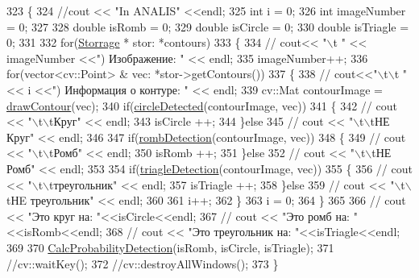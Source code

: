 \begin{DoxyCode}
323 \{
324     \textcolor{comment}{//cout << "In ANALIS" <<endl;}
325     \textcolor{keywordtype}{int} i = 0;
326     \textcolor{keywordtype}{int} imageNumber = 0;
327 
328     \textcolor{keywordtype}{double} isRomb = 0;
329     \textcolor{keywordtype}{double} isCircle = 0;
330     \textcolor{keywordtype}{double} isTriagle = 0;
331 
332     \textcolor{keywordflow}{for}(\hyperlink{class_storrage}{Storrage} * stor: *contours)
333     \{
334 \textcolor{comment}{//        cout<< "\(\backslash\)t " << imageNumber <<") Изображение: " << endl;}
335         imageNumber++;
336         \textcolor{keywordflow}{for}(vector<cv::Point> & vec: *stor->getContours())
337         \{
338 \textcolor{comment}{//            cout<<"\(\backslash\)t\(\backslash\)t "<< i <<") Информация о контуре: " << endl;}
339             cv::Mat contourImage = \hyperlink{class_contour_analis_a8dfbcc0a15123202d1af035f7206d87c}{drawContour}(vec);
340             \textcolor{keywordflow}{if}(\hyperlink{class_contour_analis_a2e67419653bf28f2bbf6766e2ffa1089}{circleDetected}(contourImage, vec))
341             \{
342 \textcolor{comment}{//                cout << "\(\backslash\)t\(\backslash\)tКруг" << endl;}
343                 isCircle ++;
344             \}\textcolor{keywordflow}{else}
345 \textcolor{comment}{//                cout << "\(\backslash\)t\(\backslash\)tНЕ Круг" << endl;}
346 
347             \textcolor{keywordflow}{if}(\hyperlink{class_contour_analis_a1970e01e1762c299753c0d57f0879915}{rombDetection}(contourImage, vec))
348             \{
349 \textcolor{comment}{//                cout << "\(\backslash\)t\(\backslash\)tРомб" << endl;}
350                 isRomb ++;
351             \}\textcolor{keywordflow}{else}
352 \textcolor{comment}{//                cout << "\(\backslash\)t\(\backslash\)tНЕ Ромб" << endl;}
353 
354             \textcolor{keywordflow}{if}(\hyperlink{class_contour_analis_a5c8b79c28a07825f5413cd98640d8dd2}{triagleDetection}(contourImage, vec))
355             \{
356 \textcolor{comment}{//                cout << "\(\backslash\)t\(\backslash\)tтреугольник" << endl;}
357                 isTriagle ++;
358             \}\textcolor{keywordflow}{else}
359 \textcolor{comment}{//                cout << "\(\backslash\)t\(\backslash\)tНE треугольник" << endl;}
360 
361             i++;
362         \}
363         i = 0;
364     \}
365 
366 \textcolor{comment}{//    cout << "Это круг на: "<<isCircle<<endl;}
367 \textcolor{comment}{//    cout << "Это ромб на: "<<isRomb<<endl;}
368 \textcolor{comment}{//    cout << "Это треугольник на: "<<isTriagle<<endl;}
369 
370     \hyperlink{class_contour_analis_a1a8b2ccb473a901f51cc21339c16c3ea}{CalcProbabilityDetection}(isRomb, isCircle, isTriagle);
371     \textcolor{comment}{//cv::waitKey();}
372     \textcolor{comment}{//cv::destroyAllWindows();}
373 \}
\end{DoxyCode}
